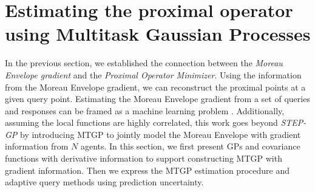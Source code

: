 \documentclass[conference]{IEEEtran}
\newcommand{\AD}[1]{}
\newcommand{\Long}[1]{}
\begin{document}



\section{Estimating the proximal operator using Multitask Gaussian Processes}
\label{sec:mtgp_with_derivative}

 In the previous section, we established the connection between the \textit{Moreau Envelope gradient} and the \textit{Proximal Operator Minimizer}.
 Using the information from the Moreau Envelope gradient, we can reconstruct the proximal points 
 at a given query point. Estimating the Moreau Envelope gradient from a set of queries and responses can be framed as a machine learning problem \cite{8635898}. Additionally, assuming the local functions are highly correlated, this work goes beyond \textit{STEP-GP} by introducing MTGP to jointly model the Moreau Envelope with gradient information from $N$ agents. In this section, we first present GPs and covariance functions with derivative information to support constructing MTGP with gradient information. Then we express the MTGP estimation procedure and adaptive query methods using prediction uncertainty.
\end{document}
